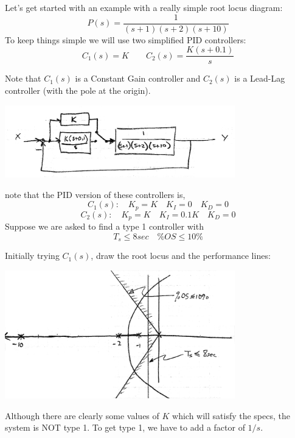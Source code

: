 \begin{Example}
Let's get started with an example with a really simple root locus diagram:
\[
P(s) = \frac  {1}   {(s+1)(s+2)(s+10)}
\]
To keep things simple we will use two simplified PID controllers:
\[
C_1(s) = K \qquad   C_2(s) = \frac   {K(s+0.1)} {s}
\]

Note that $C_1(s)$ is a Constant Gain controller and $C_2(s)$ is
a Lead-Lag controller (with the pole at the origin).


\includegraphics[width=100mm]{figs09/01107.png}

note that the PID version of these controllers is,
\[
C_1(s):  \quad K_p = K \quad K_I = 0 \quad K_D = 0
\]
\[
C_2(s):  \quad K_p = K \quad K_I = 0.1K \quad K_D = 0
\]
Suppose we are asked  to find a type 1 controller with
\[
T_s \leq 8sec \quad \%OS \leq 10\%
\]

Initially trying $C_1(s)$, draw the root locus and the performance lines:

\includegraphics[width=100mm]{figs09/01108.png}

Although   there are clearly some values of $K$ which will satisfy the specs, the system is NOT type 1.
To get type 1, we have to add a factor of $1/s$.
\end{Example}
